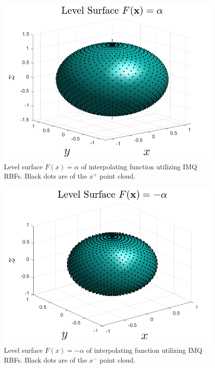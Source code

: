 \documentclass{article}
\begin{document}
\begin{itemize}
\begin{figure}[H]
        \includegraphics[scale = 0.5]{levelSphere_alpha_IMQ}
        \centering
        \caption{Level surface $F(x) = \alpha$ of interpolating function utilizing IMQ RBFs. Black dots are of the $x^+$ point cloud.}
    \end{figure}
    \begin{figure}[H]
        \includegraphics[scale = 0.5]{levelSphere_mAlpha_IMQ.png}
        \centering
        \caption{Level surface $F(x) = -\alpha$ of interpolating function utilizing IMQ RBFs. Black dots are of the $x^-$ point cloud.}
    \end{figure}
    
\end{itemize}
\end{document}
